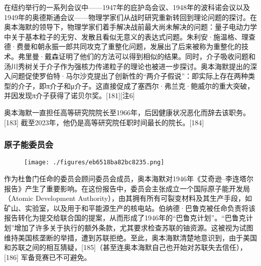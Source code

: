 在纽约举行的一系列会议中——1947年的庇护岛会议、1948年的波科诺会议以及1949年的奥德斯通会议——物理学家们从战时研究重新转回到理论问题的探讨。在奥本海默的领导下，物理学家们着手解决战前最大尚未解决的问题：量子电动力学中关于基本粒子的无穷、发散且看似无意义的表达式问题。朱利安·施温格、理查德·费曼和朝永振一郎共同攻克了重整化问题，发展出了后来被称为重整化的技术。弗里曼·戴森证明了他们的方法可以得到相似的结果。同时，介子吸收问题和汤川秀树关于介子作为强核力传递粒子的理论也被进一步探讨。奥本海默提出的深入问题促使罗伯特·马尔沙克提出了创新性的“两介子假说”：即实际上存在两种类型的介子，即π介子和μ介子。这直接促成了塞西尔·弗兰克·鲍威尔的重大突破，并因发现π介子获得了诺贝尔奖。[181][注6]

奥本海默一直担任高等研究院院长至1966年，后因健康状况恶化而辞去该职务。[183] 截至2023年，他仍是高等研究院任职时间最长的院长。[184]
\subsubsection{原子能委员会}
\begin{figure}[ht]
\centering
\texttt{[image: ./figures/eb6518ba82bc8235.png]}
\caption{} \label{fig_ABHM_10}
\end{figure}
作为杜鲁门任命的委员会顾问委员会成员，奥本海默对1946年《艾奇逊–李连塔尔报告》产生了重要影响。在这份报告中，委员会主张成立一个国际原子能开发局（Atomic Development Authority），由其拥有所有可裂变材料及其生产手段，如矿山、实验室，以及用于和平能源生产的核电站。伯纳德·巴鲁克被任命负责将该报告转化为提交给联合国的提案，从而形成了1946年的“巴鲁克计划”。“巴鲁克计划”增加了许多关于执行的额外条款，尤其要求检查苏联的铀资源。这被视为试图维持美国核垄断的举措，遭到苏联拒绝。至此，奥本海默清楚地意识到，由于美国和苏联之间的相互猜疑，[185]（甚至连奥本海默自己也开始对苏联失去信任），[186] 军备竞赛已不可避免。

